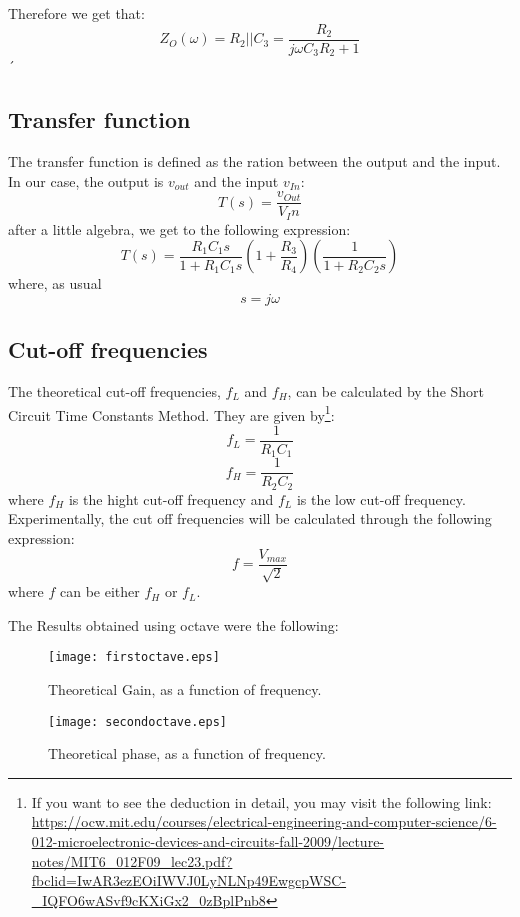 Therefore we get that:
\begin{equation}
 Z_O(\omega) = R_2 || C_3 = \frac{R_2}{j\omega C_3 R_2 + 1}  
\end{equation}
´
\subsection{Transfer function}
The transfer function is defined as the ration between the output and the input. In our case, the output is $v_{out}$ and the input $v_{In}$:
\begin{equation*}
    T(s)=\frac{v_{Out}}{V_In}
\end{equation*}
after a little algebra, we get to the following expression:
\begin{equation}
    T(s)=\frac{R_{1}C_{1}s}{1+R_{1}C_{1}s} (1 + \frac{R_{3}}{R_4}) (\frac{1}{1+ R_{2} C_{2}s}) 
\end{equation}
where, as usual
\begin{equation*}
    s = j\omega
\end{equation*}

\subsection{Cut-off frequencies}
The theoretical cut-off frequencies, $f_L$ and $f_H$, can be calculated by the Short Circuit Time Constants Method. They are given by\footnote{If you want to see the deduction in detail, you may visit the following link: \url{https://ocw.mit.edu/courses/electrical-engineering-and-computer-science/6-012-microelectronic-devices-and-circuits-fall-2009/lecture-notes/MIT6_012F09_lec23.pdf?fbclid=IwAR3ezEOiIWVJ0LyNLNp49EwgcpWSC-_IQFO6wASvf9cKXiGx2_0zBplPnb8}}:
\begin{equation}
    f_L = \frac{1}{R_1C_1}
\end{equation}
\begin{equation}
    f_H = \frac{1}{R_2C_2}
\end{equation}
where $f_H$ is the hight cut-off frequency and $f_L$ is the low cut-off frequency.
Experimentally, the cut off frequencies will be calculated through the following expression:
\begin{equation*}
    f = \frac{V_{max}}{\sqrt{2}}
\end{equation*}
where $f$ can be either $f_H$ or $f_L$.


The Results obtained using octave were the following:




\begin{figure}[H] \centering
\texttt{[image: firstoctave.eps]}
\caption{Theoretical Gain, as a function of frequency.}
\label{fig:forced1}
\end{figure}

\begin{figure}[H] \centering
    \texttt{[image: secondoctave.eps]}
    \caption{Theoretical phase, as a function of frequency.}
    \label{fig:forced2}
    \end{figure}
